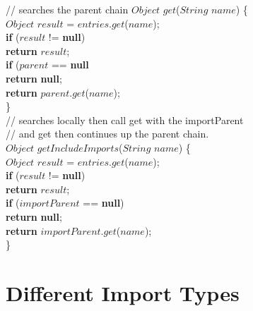 \documentclass[pdflatex,11pt,letter]{article}
\begin{document}
\noindent
\hspace*{1.0cm}// searches the parent chain
\hspace*{1.0cm}{\bf public} $Object$ $get$($String$ $name$) \{\\
\hspace*{1.5cm}  $Object$ $result$ = $entries$.$get$($name$);\\
\hspace*{1.5cm}  {\bf if} ($result$ != {\bf null})\\
\hspace*{2.0cm}    {\bf return} $result$;\\
\hspace*{1.5cm}  {\bf if} ($parent$ == {\bf null}\\
\hspace*{2.0cm}    {\bf return} {\bf null};\\
\hspace*{1.5cm}  {\bf return} $parent$.$get$($name$);\\
\hspace*{1.0cm}\}\\
$ $\\
\hspace*{1.0cm}// searches locally then call get with the importParent\\
\hspace*{1.0cm}// and get then continues up the parent chain.  \\
\hspace*{1.0cm}{\bf public} $Object$ $getIncludeImports$($String$ $name$) \{\\
\hspace*{1.5cm}  $Object$ $result$ = $entries$.$get$($name$);\\
\hspace*{1.5cm}  {\bf if} ($result$ != {\bf null})\\
\hspace*{2.0cm}    {\bf return} $result$;\\
\hspace*{1.5cm}  {\bf if} ($importParent$ == {\bf null})\\
\hspace*{2.0cm}    {\bf return} {\bf null};\\
\hspace*{1.5cm}  {\bf return} $importParent$.$get$($name$);\\
\hspace*{1.0cm}\}\\

\section{Different Import Types}
\end{document}
